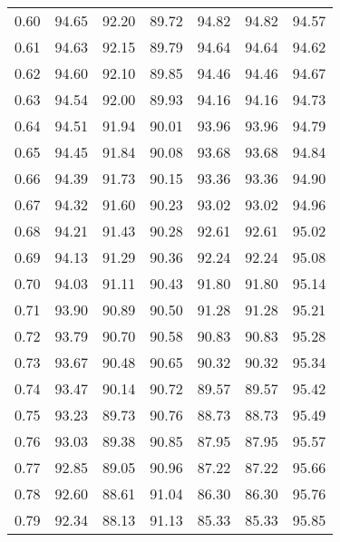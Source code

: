 \begin{tabular}{|c|c|c|c|c|c|c|}
      0.60 &     94.65 &     92.20 &      89.72 &   94.82 &      94.82 &         94.57 \\
      0.61 &     94.63 &     92.15 &      89.79 &   94.64 &      94.64 &         94.62 \\
      0.62 &     94.60 &     92.10 &      89.85 &   94.46 &      94.46 &         94.67 \\
      0.63 &     94.54 &     92.00 &      89.93 &   94.16 &      94.16 &         94.73 \\
      0.64 &     94.51 &     91.94 &      90.01 &   93.96 &      93.96 &         94.79 \\
      0.65 &     94.45 &     91.84 &      90.08 &   93.68 &      93.68 &         94.84 \\
      0.66 &     94.39 &     91.73 &      90.15 &   93.36 &      93.36 &         94.90 \\
      0.67 &     94.32 &     91.60 &      90.23 &   93.02 &      93.02 &         94.96 \\
      0.68 &     94.21 &     91.43 &      90.28 &   92.61 &      92.61 &         95.02 \\
      0.69 &     94.13 &     91.29 &      90.36 &   92.24 &      92.24 &         95.08 \\
      0.70 &     94.03 &     91.11 &      90.43 &   91.80 &      91.80 &         95.14 \\
      0.71 &     93.90 &     90.89 &      90.50 &   91.28 &      91.28 &         95.21 \\
      0.72 &     93.79 &     90.70 &      90.58 &   90.83 &      90.83 &         95.28 \\
      0.73 &     93.67 &     90.48 &      90.65 &   90.32 &      90.32 &         95.34 \\
      0.74 &     93.47 &     90.14 &      90.72 &   89.57 &      89.57 &         95.42 \\
      0.75 &     93.23 &     89.73 &      90.76 &   88.73 &      88.73 &         95.49 \\
      0.76 &     93.03 &     89.38 &      90.85 &   87.95 &      87.95 &         95.57 \\
      0.77 &     92.85 &     89.05 &      90.96 &   87.22 &      87.22 &         95.66 \\
      0.78 &     92.60 &     88.61 &      91.04 &   86.30 &      86.30 &         95.76 \\
      0.79 &     92.34 &     88.13 &      91.13 &   85.33 &      85.33 &         95.85 \\

\end{tabular}
